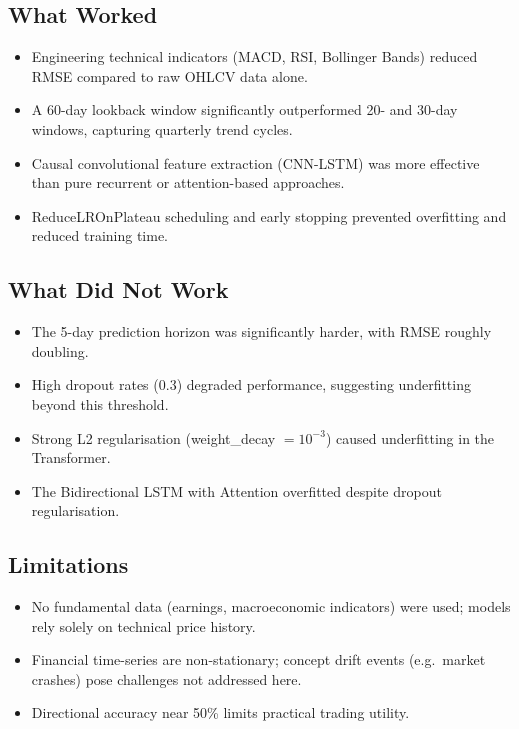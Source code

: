 \documentclass[11pt]{article}
\begin{document}
\subsection{What Worked}

\begin{itemize}
  \item Engineering technical indicators (MACD, RSI, Bollinger Bands)
        reduced RMSE compared to raw OHLCV data alone.
  \item A 60-day lookback window significantly outperformed 20- and
        30-day windows, capturing quarterly trend cycles.
  \item Causal convolutional feature extraction (CNN-LSTM) was more
        effective than pure recurrent or attention-based approaches.
  \item ReduceLROnPlateau scheduling and early stopping prevented
        overfitting and reduced training time.
\end{itemize}

\subsection{What Did Not Work}

\begin{itemize}
  \item The 5-day prediction horizon was significantly harder, with
        RMSE roughly doubling.
  \item High dropout rates (0.3) degraded performance, suggesting
        underfitting beyond this threshold.
  \item Strong L2 regularisation (weight\_decay $= 10^{-3}$) caused
        underfitting in the Transformer.
  \item The Bidirectional LSTM with Attention overfitted despite
        dropout regularisation.
\end{itemize}

\subsection{Limitations}

\begin{itemize}
  \item No fundamental data (earnings, macroeconomic indicators) were
        used; models rely solely on technical price history.
  \item Financial time-series are non-stationary; concept drift events
        (e.g.\ market crashes) pose challenges not addressed here.
  \item Directional accuracy near 50\% limits practical trading
        utility.
\end{itemize}
\end{document}
